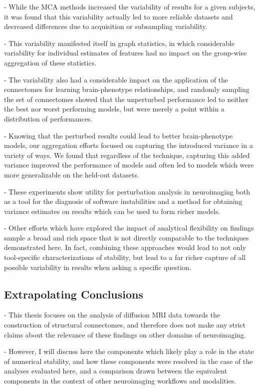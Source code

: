 - While the MCA methods increased the variability of results for a given subjects, it was found that this variability
actually led to more reliable datasets and decreased differences due to acquisition or subsampling variability.

- This variability manifested itself in graph statistics, in which considerable variability for individual estimates
of features had no impact on the group-wise aggregation of these statistics.

- The variability also had a considerable impact on the application of the connectomes for learning brain-phenotype
relationships, and randomly sampling the set of connectomes showed that the unperturbed performance led to neither
the best nor worst performing models, but were merely a point within a distribution of performances.

- Knowing that the perturbed results could lead to better brain-phenotype models, our aggregation efforts focused on
capturing the introduced variance in a variety of ways. We found that regardless of the technique, capturing this
added variance improved the performance of models and often led to models which were more generalizable on the
held-out datasets.

- These experiments show utility for perturbation analysis in neuroimaging both as a tool for the diagnosis of
software instabilities and a method for obtaining variance estimates on results which can be used to form richer
models.

- Other efforts which have explored the impact of analytical flexibility on findings sample a broad and rich space
that is not directly comparable to the techniques demonstrated here. In fact, combining these approaches would lead
to not only tool-specific characterizations of stability, but lead to a far richer capture of all possible
variability in results when asking a specific question.

\subsection{Extrapolating Conclusions}
- This thesis focuses on the analysis of diffusion MRI data towards the construction of structural connectomes, and
therefore does not make any strict claims about the relevance of these findings on other domains of neuroimaging.

- However, I will discuss here the components which likely play a role in the state of numerical stability, and how
these components were resolved in the case of the analyses evaluated here, and a comparison drawn between the
equivalent components in the context of other neuroimaging workflows and modalities.


